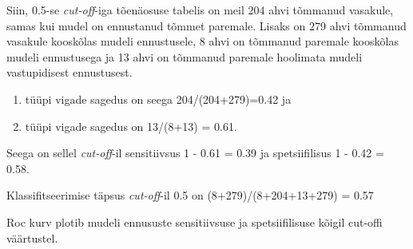 \documentclass[]{book}
\newenvironment{Shaded}{\begin{snugshade}}{\end{snugshade}}
\newcommand{\CommentTok}[1]{\textcolor[rgb]{0.56,0.35,0.01}{\textit{#1}}}
\newcommand{\DataTypeTok}[1]{\textcolor[rgb]{0.13,0.29,0.53}{#1}}
\newcommand{\DecValTok}[1]{\textcolor[rgb]{0.00,0.00,0.81}{#1}}
\newcommand{\FloatTok}[1]{\textcolor[rgb]{0.00,0.00,0.81}{#1}}
\newcommand{\KeywordTok}[1]{\textcolor[rgb]{0.13,0.29,0.53}{\textbf{#1}}}
\newcommand{\NormalTok}[1]{#1}
\newcommand{\OperatorTok}[1]{\textcolor[rgb]{0.81,0.36,0.00}{\textbf{#1}}}
\newcommand{\OtherTok}[1]{\textcolor[rgb]{0.56,0.35,0.01}{#1}}
\newcommand{\StringTok}[1]{\textcolor[rgb]{0.31,0.60,0.02}{#1}}
\begin{document}
\begin{Shaded}
\end{Shaded}

Siin, 0.5-se \emph{cut-off}-iga tõenäosuse tabelis on meil 204 ahvi tõmmanud vasakule, samas kui mudel on ennustanud tõmmet paremale. Lisaks on 279 ahvi tõmmanud vasakule kooskõlas mudeli ennustusele, 8 ahvi on tõmmanud paremale kooskõlas mudeli ennustusega ja 13 ahvi on tõmmanud paremale hoolimata mudeli vastupidisest ennustusest.

\begin{enumerate}
\def\labelenumi{\arabic{enumi}.}
\item
  tüüpi vigade sagedus on seega 204/(204+279)=0.42 ja
\item
  tüüpi vigade sagedus on 13/(8+13) = 0.61.
\end{enumerate}

Seega on sellel \emph{cut-off}-il sensitiivsus 1 - 0.61 = 0.39 ja spetsiifilisus 1 - 0.42 = 0.58.

Klassifitseerimise täpsus \emph{cut-off}-il 0.5 on (8+279)/(8+204+13+279) = 0.57

Roc kurv plotib mudeli ennususte sensitiivsuse ja spetsiifilisuse kõigil cut-offi väärtustel.
\end{document}
